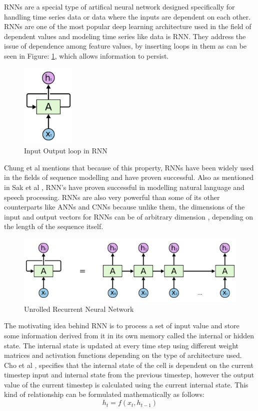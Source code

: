 \documentclass[letterpaper, 12 pt, conference]{ieeeconf}  %
\begin{document}
RNNs are a special type of artifical neural network designed specifically for handling time series data or data where the inputs are dependent on each other. RNNs are one of the most popular deep learning architecture used in the field of dependent values and modeling time series like data is RNN. They address the issue of dependence among feature values, by inserting loops in them as can be seen in Figure: \ref{fig:RNN_Loop}, which allows information to persist. 

\begin{figure}[!h]
\centering
\includegraphics[scale=0.7]{../figs/rnn/loop.png}	
\caption{Input Output loop in RNN}
\label{fig:RNN_Loop} 
\end{figure}

Chung et al \cite{gru_evaluation} mentions that because of this property, RNNs have been widely used in the fields of sequence modelling and have proven successful. Also as mentioned in Sak	et al \cite{google_accoustics} \cite{google_speech}, RNN's have proven successful in modelling natural language and speech processing. RNNs are also very powerful than some of its other counterparts like ANNs and CNNs because unlike them, the dimensions of the input and output vectors for RNNs can be of arbitrary dimension	 \cite{gru_evaluation}, depending on the length of the sequence itself.

\begin{figure}[!h]
\centering
\includegraphics[scale=0.5]{../figs/rnn/unrolled.png}	
\caption{Unrolled Recurrent Neural Network}
\label{fig:RNN_Unrolled} 
\end{figure}

The motivating idea behind RNN is to process a set of input value and store some information derived from it in its own memory called the internal or hidden state. The internal state is updated at every time step using different weight matrices and activation functions depending on the type of architecture used. Cho et al \cite{gru_translation}, specifies that the internal state of the cell is dependent on the current timestep input and internal state from the previous timestep, however the output value of the current timestep is calculated using the current internal state. This kind of relationship can be formulated mathematically as follows:
\begin{equation}
h_t = f(x_t, h_{t-1})
\end{equation}
\end{document}
